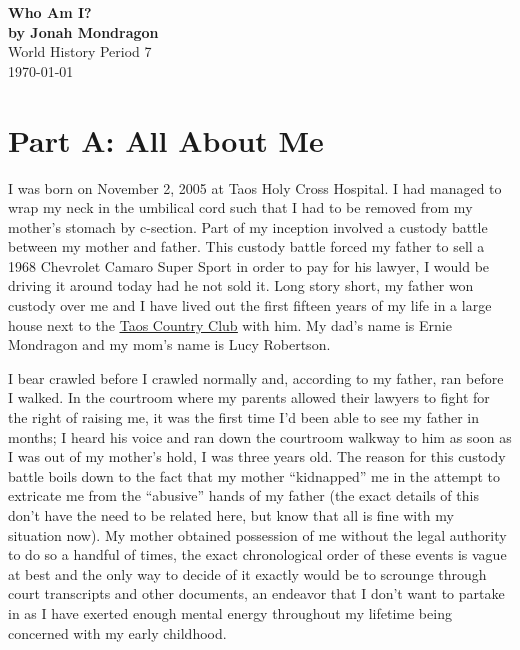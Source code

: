 \documentclass[12pt]{article}
\begin{document}
\doublespacing

\begin{titlepage}
    \begin{center}
        \vspace*{1.5in}
        {\huge\bfseries{Who Am I?}}\\
            {\bfseries{by Jonah Mondragon}}\\
            World History Period 7\\
            \today
    \end{center}
\end{titlepage}

\section*{Part A: All About Me}

I was born on November 2, 2005 at Taos Holy Cross Hospital.  I had managed to
wrap my neck in the umbilical cord such that I had to be removed from my
mother's stomach by c-section.  Part of my inception involved a custody battle
between my mother and father.  This custody battle forced my father to sell a
1968 Chevrolet Camaro Super Sport in order to pay for his lawyer, I would be
driving it around today had he not sold it.  Long story short, my father won
custody over me and I have lived out the first fifteen years of my life in a
large house next to the {\color{blue}
\underline{\href{https://www.taoscountryclub.com/}{Taos Country Club}}} with
him. My dad's name is Ernie Mondragon and my mom's name is Lucy Robertson.

I bear crawled before I crawled normally and, according to my father, ran
before I walked.  In the courtroom where my parents allowed their lawyers to
fight for the right of raising me, it was the first time I'd been able to see
my father in months; I heard his voice and ran down the
courtroom walkway to him as soon as I was out of my mother's hold, I was three
years old. The reason for this custody battle boils down to
the fact that my mother ``kidnapped'' me in the attempt to extricate me from
the ``abusive'' hands of my father (the exact details of this don't have the
need to be related here, but know that all is fine with my situation now).  My
mother obtained possession of me without the legal authority to do so a handful
of times, the exact chronological order of these events is vague at best and
the only way to decide of it exactly would be to scrounge through court
transcripts and other documents, an endeavor that I don't want to partake in as
I have exerted enough mental energy throughout my lifetime being concerned with
my early childhood.
\end{document}
